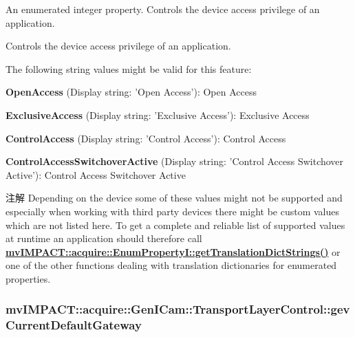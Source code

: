 An enumerated integer property. Controls the device access privilege of an application. 

Controls the device access privilege of an application.

The following string values might be valid for this feature\+:
\begin{DoxyItemize}
\item {\bfseries Open\+Access} (Display string\+: 'Open Access')\+: Open Access
\item {\bfseries Exclusive\+Access} (Display string\+: 'Exclusive Access')\+: Exclusive Access
\item {\bfseries Control\+Access} (Display string\+: 'Control Access')\+: Control Access
\item {\bfseries Control\+Access\+Switchover\+Active} (Display string\+: 'Control Access Switchover Active')\+: Control Access Switchover Active
\end{DoxyItemize}

\begin{DoxyNote}{注解}
Depending on the device some of these values might not be supported and especially when working with third party devices there might be custom values which are not listed here. To get a complete and reliable list of supported values at runtime an application should therefore call {\bfseries \hyperlink{classmv_i_m_p_a_c_t_1_1acquire_1_1_enum_property_i_a0ba6ccbf5ee69784d5d0b537924d26b6}{mv\+I\+M\+P\+A\+C\+T\+::acquire\+::\+Enum\+Property\+I\+::get\+Translation\+Dict\+Strings()}} or one of the other functions dealing with translation dictionaries for enumerated properties. 
\end{DoxyNote}
\hypertarget{classmv_i_m_p_a_c_t_1_1acquire_1_1_gen_i_cam_1_1_transport_layer_control_af61d2dde90b5f4b07844d681009e4e7b}{
\subsubsection[{gev\+Current\+Default\+Gateway}]{ mv\+I\+M\+P\+A\+C\+T\+::acquire\+::\+Gen\+I\+Cam\+::\+Transport\+Layer\+Control\+::gev\+Current\+Default\+Gateway}}\label{classmv_i_m_p_a_c_t_1_1acquire_1_1_gen_i_cam_1_1_transport_layer_control_af61d2dde90b5f4b07844d681009e4e7b}


